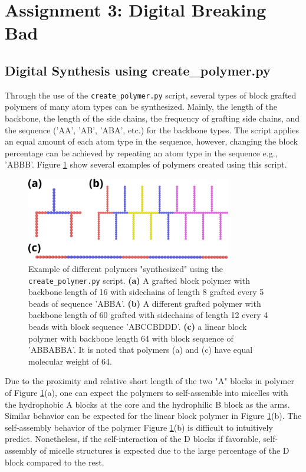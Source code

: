 \documentclass[10pt,a4paper]{labreport}
\begin{document}
\newpage
\section{Assignment 3: Digital Breaking Bad}
\subsection{Digital Synthesis using create\_polymer.py}
Through the use of the \texttt{create\_polymer.py} script, several types of block grafted polymers of many atom types can be synthesized. Mainly, the length of the backbone, the length of the side chains, the frequency of grafting side chains, and the sequence ('AA', 'AB', 'ABA', etc.) for the backbone types. 
The script applies an equal amount of each atom type in the sequence, however, changing the block percentage can be achieved by repeating an atom type in the sequence e.g.,  'ABBB'. Figure \ref{fig:ass3_testTopos} show several examples of polymers created using this script.

\begin{figure}[h]
  \centering  
  \includegraphics[width = 0.8\textwidth]{figs/ass3_test-topos.png}
  \caption{Example of different polymers "synthesized" using the \texttt{create\_polymer.py} script. \textbf{(a)} A grafted block polymer with backbone length of 16 with  sidechains of length 8 grafted every 5 beads of sequence 'ABBA'. \textbf{(b)} A different grafted polymer with backbone length of 60  grafted with sidechains of length 12 every 4 beads with block sequence 'ABCCBDDD'.  \textbf{(c)} a linear block polymer with backbone length 64 with block sequence of 'ABBABBA'. It is noted that polymers (a) and (c) have equal molecular weight of 64.}
  \label{fig:ass3_testTopos}
\end{figure}

Due to the proximity and relative short length of the two "A" blocks in polymer of Figure \ref{fig:ass3_testTopos}(a), one can expect the polymers to self-assemble into micelles with the hydrophobic A blocks at the core and the hydrophilic B block as the arms. Similar behavior can be expected for the linear block polymer in Figure \ref{fig:ass3_testTopos}(b). The self-assembly behavior of the polymer Figure \ref{fig:ass3_testTopos}(b) is difficult to intuitively predict. Nonetheless, if the self-interaction of the D blocks if favorable, self-assembly of micelle structures is expected due to the large percentage of the D block compared to the rest.  
\end{document}
